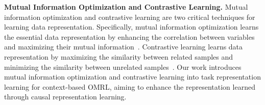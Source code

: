 \noindent\textbf{Mutual Information Optimization and Contrastive Learning.}
Mutual information optimization and contrastive learning are two critical techniques for learning data representation. Specifically, mutual information optimization learns the essential data representation by enhancing the correlation between variables and maximizing their mutual information~\cite{oord2018representation,mu2022domino, choshen2023contrabar}. Contrastive learning learns data representation by maximizing the similarity between related samples and minimizing the similarity between unrelated samples~\cite{chen2020improved,caron2021emerging,yan2021consert,gao2021simcse,liu2023contrastive, oord2018representation}. Our work introduces mutual information optimization and contrastive learning into task representation learning for context-based OMRL, aiming to enhance the representation learned through causal representation learning.